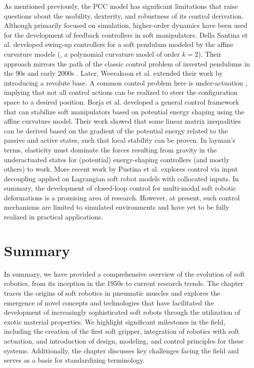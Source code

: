 As mentioned previously, the PCC model has significant limitations that raise questions about the usability, dexterity, and robustness of its control derivation. Although primarily focused on simulation, higher-order dynamics have been used for the development of feedback controllers in soft manipulators. Della Santina et al. \cite{DellaSantina2020Dec} developed swing-up controllers for a soft pendulum modeled by the affine curvature models (\ie, a polynomial curvature model \cite{DellaSantina2020} of order $k = 2$). Their approach mirrors the path of the classic control problem of inverted pendulums in the 90s and early 2000s \cite{Spong1996,Spong1994,Ortega1998,Shiriaev1999Dec}. Later, Weerakoon et al. \cite{Weerakoon2021Dec} extended their work by introducing a revolute base. A common control problem here is under-actuation \cite{Tedrake2022,Spong2006,Murray1994}, implying that not all control actions can be realized to steer the configuration space to a desired position. Borja et al. \cite{Borja2022Apr} developed a general control framework that can stabilize soft manipulators based on potential energy shaping using the affine curvature model. Their work showed that some linear matrix inequalities can be derived based on the gradient of the potential energy related to the passive and active states, such that local stability can be proven. In layman's terms, elasticity must dominate the forces resulting from gravity in the underactuated states for (potential) energy-shaping controllers (and mostly others) to work. More recent work by Pustina et al. \cite{Pustina2023Jun} explores control via input decoupling applied on Lagrangian soft robot models with collocated inputs. In summary, the development of closed-loop control for multi-modal soft robotic deformations is a promising area of research. However, at present, such control mechanisms are limited to simulated environments and have yet to be fully realized in practical applications.

\section{Summary}
In summary, we have provided a comprehensive overview of the evolution of soft robotics, from its inception in the 1950s to current research trends. The chapter traces the origins of soft robotics in pneumatic muscles and explores the emergence of novel concepts and technologies that have facilitated the development of increasingly sophisticated soft robots through the utilization of exotic material properties. We highlight significant milestones in the field, including the creation of the first soft gripper, integration of robotics with soft actuation, and introduction of design, modeling, and control principles for these systems. Additionally, the chapter discusses key challenges facing the field and serves as a basis for standardizing terminology.
